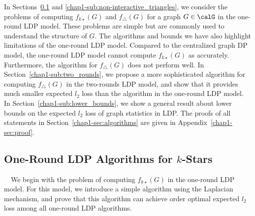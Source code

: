 In 
Sections~\ref{chap1-sub:non-interactive_k_stars} and \ref{chap1-sub:non-interactive_triangles}, 
we consider the problems of computing $f_{k\star}(G)$ 
and $f_\triangle(G)$ 
for a graph $G \in \calG$ in the 
one-round 
LDP model. 
These problems are simple but are commonly used to understand the structure of $G$. 
The algorithms and bounds we have also highlight limitations of the
one-round 
LDP model. Compared to the centralized graph DP model, the
one-round 
LDP model cannot compute $f_{k\star}(G)$ as accurately.
Furthermore, the algorithm for $f_\triangle(G)$ does not perform 
well. 
In Section~\ref{chap1-sub:two_rounds}, we propose a more sophisticated algorithm for computing  $f_\triangle(G)$ in the two-rounds LDP model, and show that it provides much smaller expected $l_2$ loss than the algorithm in the one-round LDP model.
In Section~\ref{chap1-sub:lower_bounds}, we show a general result about lower bounds on the expected $l_2$ loss of graph statistics in LDP. 
The proofs of all statements in Section~\ref{chap1-sec:algorithms} are given in Appendix~\ref{chap1-sec:proof}.

\subsection{One-Round LDP Algorithms for $k$-Stars}
\label{chap1-sub:non-interactive_k_stars}

~~We begin with the problem of computing $f_{k\star}(G)$ in the 
one-round 
LDP model. 
For this model, we introduce a simple algorithm using the Laplacian mechanism, and prove that this algorithm can achieve order optimal expected $l_2$ loss among all one-round LDP algorithms. 

